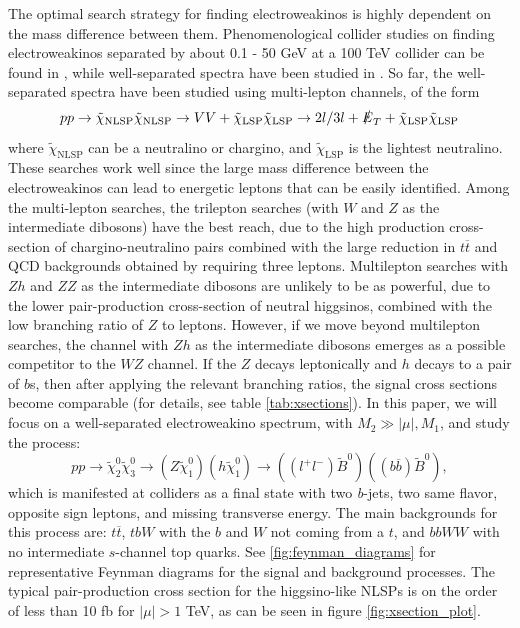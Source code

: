 The optimal search strategy for finding electroweakinos is highly dependent on the mass difference between them. Phenomenological collider studies on finding electroweakinos separated by about 0.1 - 50 GeV at a 100 TeV collider can be found in \citep{Low2014, Plehn2015, Berlin2015, Cirelli2014}, while well-separated spectra have been studied in \citep{Gori:2014oua, Acharya2014}.
So far, the well-separated spectra have been studied using multi-lepton channels, of the form 
\[pp\rightarrow \tilde{\chi}_\text{NLSP}\tilde{\chi}_\text{NLSP}\rightarrow VV + \tilde{\chi}_\text{LSP}\tilde{\chi}_\text{LSP}\rightarrow 2l/3l + \slashed{E}_T +  \tilde{\chi}_\text{LSP}\tilde{\chi}_\text{LSP}\]
where $\tilde{\chi}_\text{NLSP}$ can be a neutralino or chargino, and $\tilde{\chi}_\text{LSP}$ is the lightest neutralino. These searches work well since the large mass difference between the electroweakinos can lead to energetic leptons that can be easily identified. Among the multi-lepton searches, the trilepton searches (with $W$ and $Z$ as the intermediate dibosons) have the best reach, due to the high production cross-section of chargino-neutralino pairs combined with the large reduction in $t\overline{t}$ and QCD backgrounds obtained by requiring three leptons. Multilepton searches with $Zh$ and $ZZ$ as the intermediate dibosons are unlikely to be as powerful, due to the lower pair-production cross-section of neutral higgsinos, combined with the low branching ratio of $Z$ to leptons. However, if we move beyond multilepton searches, the channel with $Zh$ as the intermediate dibosons emerges as a possible competitor to the $WZ$ channel. If the $Z$ decays leptonically and $h$ decays to a pair of $b$s, then after applying the relevant branching ratios, the signal cross sections become comparable (for details, see table \ref{tab:xsections}). 
In this paper, we will focus on a well-separated electroweakino spectrum, with $M_2 \gg |\mu|,M_1$, and study the process:
\[pp\rightarrow \tilde{\chi}_{2}^{0}\tilde{\chi}_{3}^{0}\rightarrow (Z\tilde{\chi}_1^{0})(h\tilde{\chi}_1^{0})\rightarrow ((l^+l^-)\tilde{B}^{0})((b\overline{b})\tilde{B}^0),\]
which is manifested at colliders as a final state with two \emph{b}-jets, two same flavor, opposite sign leptons, and missing transverse energy. The main backgrounds for this process are: $t\overline{t}$, $tbW$ with the $b$ and $W$ not coming from a $t$, and $bbWW$ with no intermediate $s$-channel top quarks. See \autoref{fig:feynman_diagrams} for representative Feynman diagrams for the signal and background processes. The typical pair-production cross section for the higgsino-like NLSPs is on the order of less than 10 fb for $|\mu|>1$ TeV, as can be seen in figure \ref{fig:xsection_plot}.  

